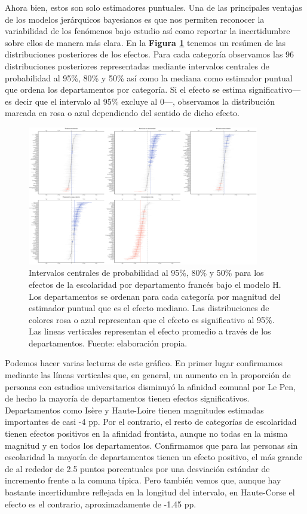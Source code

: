 Ahora bien, estos son solo estimadores puntuales. Una de las principales ventajas de los modelos jerárquicos bayesianos es que nos permiten reconocer la variabilidad de los fenómenos bajo estudio así como reportar la incertidumbre sobre ellos de manera más clara. En la \textbf{Figura \ref{fig:Efectos_Escolaridad}} tenemos un resúmen de las distribuciones posteriores de los efectos. Para cada categoría observamos las 96 distribuciones posteriores representadas mediante intervalos centrales de probabilidad al 95\%, 80\% y 50\% así como la mediana como estimador puntual que ordena los departamentos por categoría. Si el efecto se estima significativo--- es decir que el intervalo al 95\% excluye al 0---, observamos la distribución marcada en rosa o azul dependiendo del sentido de dicho efecto.\\
  
\begin{figure}[h]
	\centering
	\includegraphics[width = 0.9\textwidth]{Figs/Efectos/Efectos_Escolaridad_Modelo_H}
	\caption{Intervalos centrales de probabilidad al 95\%, 80\% y 50\% para los efectos de la escolaridad por departamento francés bajo el modelo H. Los departamentos se ordenan para cada categoría por magnitud del estimador puntual que es el efecto mediano. Las distribuciones de colores rosa o azul representan que el efecto es significativo al 95\%. Las lineas verticales representan el efecto promedio a través de los departamentos. Fuente: elaboración propia.}
	\label{fig:Efectos_Escolaridad}
\end{figure}

Podemos hacer varias lecturas de este gráfico. En primer lugar confirmamos mediante las líneas verticales que, en general, un aumento en la proporción de personas con estudios universitarios disminuyó la afinidad comunal por Le Pen, de hecho la mayoría de departamentos tienen efectos significativos. Departamentos como Isère y Haute-Loire tienen magnitudes estimadas importantes de casi -4 pp. Por el contrario, el resto de categorías de escolaridad tienen efectos positivos en la afinidad frontista, aunque no todas en la misma magnitud y en todos los departamentos. Confirmamos que para las personas sin escolaridad la mayoría de departamentos tienen un efecto positivo, el más grande de al rededor de 2.5 puntos porcentuales por una desviación estándar de incremento frente a la comuna típica. Pero también vemos que, aunque hay bastante incertidumbre reflejada en la longitud del intervalo, en Haute-Corse el efecto es el contrario, aproximadamente de -1.45 pp.\\ 

